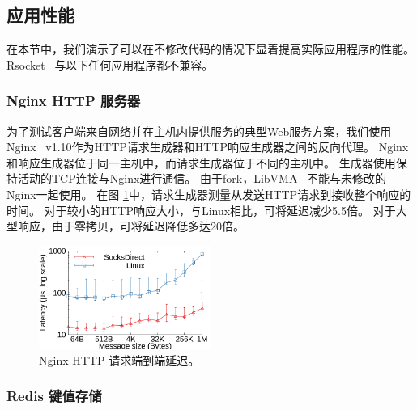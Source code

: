 \subsection{应用性能}
\label{socksdirect:subsec:application}


在本节中，我们演示了\sys {}可以在不修改代码的情况下显着提高实际应用程序的性能。
Rsocket~ \cite {rsockets}与以下任何应用程序都不兼容。

\subsubsection{Nginx HTTP 服务器}



为了测试客户端来自网络并在主机内提供服务的典型Web服务方案，我们使用Nginx~ \cite {nginx} v1.10作为HTTP请求生成器和HTTP响应生成器之间的反向代理。
Nginx和响应生成器位于同一主机中，而请求生成器位于不同的主机中。
生成器使用保持活动的TCP连接与Nginx进行通信。
由于fork，LibVMA~ \cite {libvma}不能与未修改的Nginx一起使用。
在图 \ref {socksdirect:fig:eval-nginx}中，请求生成器测量从发送HTTP请求到接收整个响应的时间。
对于较小的HTTP响应大小，与Linux相比，\sys {}可将延迟减少5.5倍。
对于大型响应，由于零拷贝，\sys {}可将延迟降低多达20倍。

\begin{figure}[htbp]
	\centering \includegraphics[width=0.5\textwidth]{eval/web/msgsize-clocal-lat.pdf}
	
	\caption{Nginx HTTP 请求端到端延迟。}
	\label{socksdirect:fig:eval-nginx}
\end{figure}



\subsubsection{Redis 键值存储}

